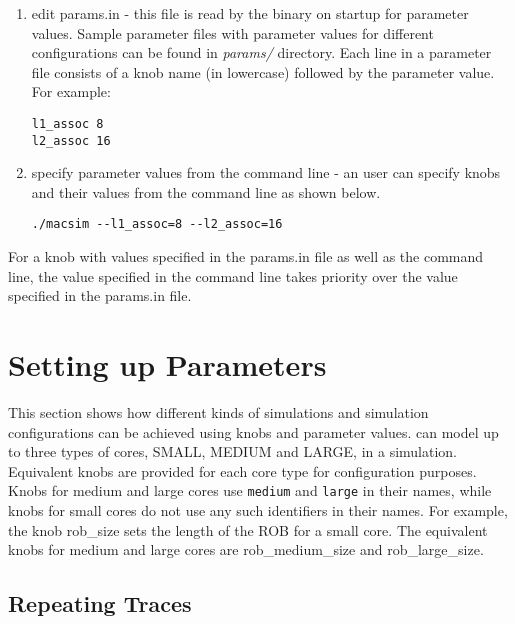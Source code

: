 \begin{enumerate}
\item edit params.in - this file is read by the \SIM binary on startup for
parameter values.  Sample parameter files with parameter values for different
configurations can be found in \textit{params/} directory. Each line in
a parameter file consists of a knob name (in lowercase) followed by the
parameter value. For example:
\begin{Verbatim}
l1_assoc 8
l2_assoc 16
\end{Verbatim}


\item specify parameter values from the command line - an user can specify
knobs and their values from the command line as shown below.

\begin{Verbatim}
./macsim --l1_assoc=8 --l2_assoc=16
\end{Verbatim}
\end{enumerate}

For a knob with values specified in the params.in file as well as the command
line, the value specified in the command line takes priority over the value
specified in the params.in file.


\section{Setting up Parameters}
\label{sec:parameter}

This section shows how different kinds of simulations and simulation
configurations can be achieved using knobs and parameter values. \SIM can model up
to three types of cores, SMALL, MEDIUM and LARGE, in a simulation. Equivalent
knobs are provided for each core type for configuration purposes. Knobs for
medium and large cores use \Verb+medium+ and \Verb+large+ in their names, while
knobs for small cores do not use any such identifiers in their names. For
example, the knob rob\_size sets the length of the ROB for a small core. The
equivalent knobs for medium and large cores are rob\_medium\_size and
rob\_large\_size.


\subsection{Repeating Traces}

